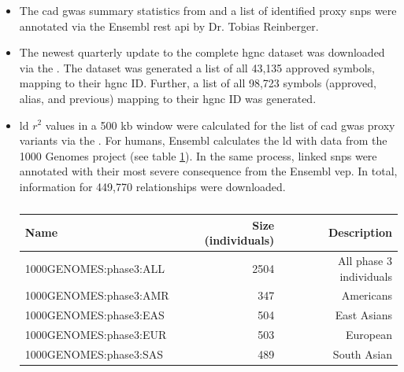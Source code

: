 \begin{itemize}
    \item {} The \ac{cad} \ac{gwas} summary statistics from \textcite{aragamDiscoverySystematicCharacterization2021} and a list of identified proxy \acp{snp} were annotated via the Ensembl \ac{rest} \ac{api} by Dr. Tobias Reinberger.

    \item {} The newest quarterly update to the complete \ac{hgnc} dataset was downloaded via the . The dataset was generated a list of all 43,135 approved symbols, mapping to their \ac{hgnc} ID. Further, a list of all 98,723 symbols (approved, alias, and previous) mapping to their \ac{hgnc} ID was generated.

    \item {} \ac{ld} $r^2$ values in a 500 kb window were calculated for the list of \ac{cad} \ac{gwas} proxy variants via the . For humans, Ensembl calculates the \ac{ld} with data from the 1000 Genomes project (see table \ref{tab:populations}). In the same process, linked \acp{snp} were annotated with their most severe consequence from the Ensembl \ac{vep}. In total, information for 449,770 relationships were downloaded.

    \begin{table}[h]
    \capstart
    \centering
    \begin{minipage}{\captionwidth}
        \caption[1000 Genomes Populations]{}
        \label{tab:populations}
    \end{minipage}
    \begin{tabular}{|l|r|r|}
        \hline
        Name                   & Size (individuals)   & Description      \\ \hline
        1000GENOMES:phase3:ALL & 2504                 & All phase 3 individuals  \\
        1000GENOMES:phase3:AMR & 347                  & Americans  \\
        1000GENOMES:phase3:EAS & 504                  & East Asians  \\
        1000GENOMES:phase3:EUR & 503                  & European \\
        1000GENOMES:phase3:SAS & 489                  & South Asian  \\ \hline
    \end{tabular}
    \end{table}


\end{itemize}
